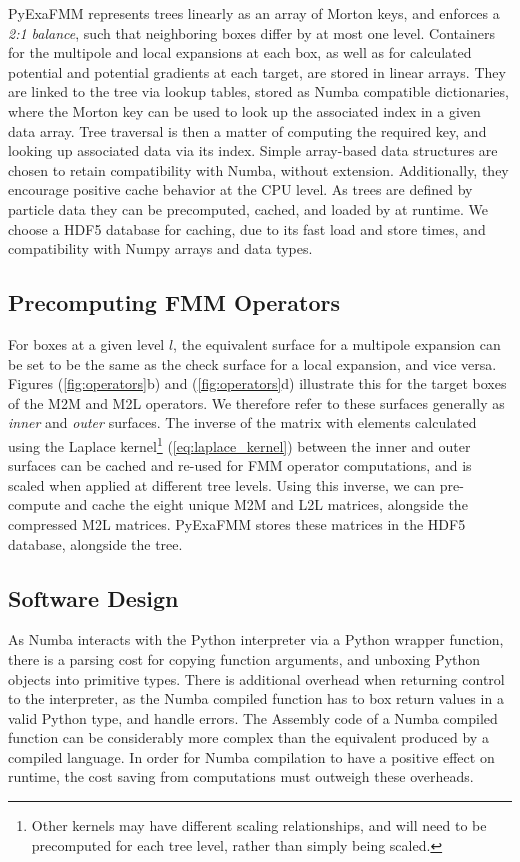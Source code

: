 \documentclass{IEEEcsmag}
\begin{document}
PyExaFMM represents trees linearly as an array of Morton keys, and enforces a \textit{2:1 balance}, such that neighboring boxes differ by at most one level. Containers for the multipole and local expansions at each box, as well as for calculated potential and potential gradients at each target, are stored in linear arrays. They are linked to the tree via lookup tables, stored as Numba compatible dictionaries, where the Morton key can be used to look up the associated index in a given data array. Tree traversal is then a matter of computing the required key, and looking up associated data via its index. Simple array-based data structures are chosen to retain compatibility with Numba, without extension. Additionally, they encourage positive cache behavior at the CPU level. As trees are defined by particle data they can be precomputed, cached, and loaded by at runtime. We choose a HDF5 database for caching, due to its fast load and store times, and compatibility with Numpy arrays and data types.

\subsection{Precomputing FMM Operators}

For boxes at a given level $l$, the equivalent surface for a multipole expansion can be set to be the same as the check surface for a local expansion, and vice versa. Figures (\ref{fig:operators}b) and (\ref{fig:operators}d) illustrate this for the target boxes of the M2M and M2L operators. We therefore refer to these surfaces generally as \textit{inner} and \textit{outer} surfaces. The inverse of the matrix with elements calculated using the Laplace kernel\footnote{Other kernels may have different scaling relationships, and will need to be precomputed for each tree level, rather than simply being scaled.} (\ref{eq:laplace_kernel}) between the inner and outer surfaces can be cached and re-used for FMM operator computations, and is scaled when applied at different tree levels. Using this inverse, we can pre-compute and cache the eight unique M2M and L2L matrices, alongside the compressed M2L matrices. PyExaFMM stores these matrices in the HDF5 database, alongside the tree.

\subsection{Software Design}

As Numba interacts with the Python interpreter via a Python wrapper function, there is a parsing cost for copying function arguments, and unboxing Python objects into primitive types. There is additional overhead when returning control to the interpreter, as the Numba compiled function has to box return values in a valid Python type, and handle errors. The Assembly code of a Numba compiled function can be considerably more complex than the equivalent produced by a compiled language. In order for Numba compilation to have a positive effect on runtime, the cost saving from computations must outweigh these overheads.
\end{document}
